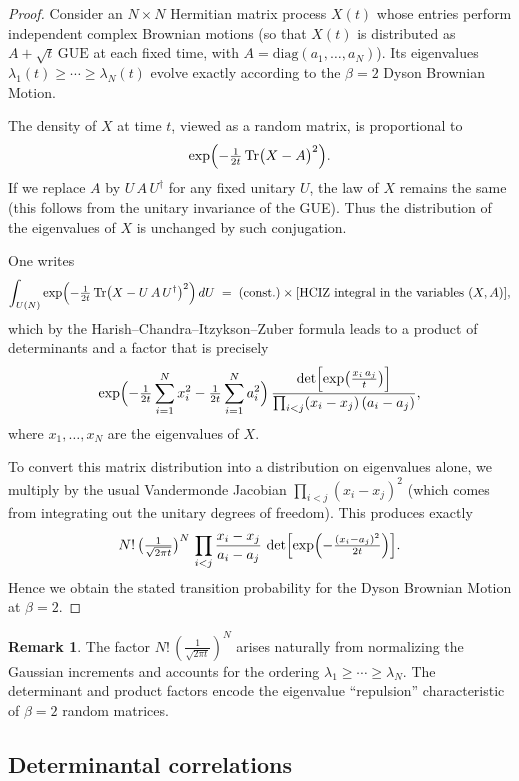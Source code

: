 \documentclass[letterpaper,11pt,oneside,reqno]{book}
\numberwithin{equation}{chapter}  %
\theoremstyle{definition}
\newtheorem{remark}[proposition]{Remark}
\begin{document}
\begin{proof}
Consider an \(N\times N\) Hermitian matrix process \(X(t)\) whose entries perform independent complex Brownian motions (so that \(X(t)\) is distributed as \(A + \sqrt{t}\,\mathrm{GUE}\) at each fixed time, with \(A=\mathrm{diag}(a_1,\dots,a_N)\)).  Its eigenvalues \(\lambda_1(t)\ge \cdots \ge \lambda_N(t)\) evolve exactly according to the \(\beta=2\) Dyson Brownian Motion.

The density of \(X\) at time \(t\), viewed as a random matrix, is proportional to
\[
\exp\Bigl(-\tfrac{1}{2t}\,\mathrm{Tr}\bigl(X-A\bigr)^2\Bigr).
\]
If we replace \(A\) by \(U\,A\,U^\dagger\) for any fixed unitary \(U\), the law of \(X\) remains the same (this follows from the unitary invariance of the GUE).  Thus the distribution of the eigenvalues of \(X\) is unchanged by such conjugation.

One writes
\[
\int_{U(N)}
\exp\Bigl(-\tfrac{1}{2t}\,\mathrm{Tr}\bigl(X-U\,A\,U^\dagger\bigr)^2\Bigr)\,dU
\;=\;
\text{(const.)} \times
\text{[HCIZ integral in the variables }(X,A)\text{]},
\]
which by the Harish--Chandra--Itzykson--Zuber formula leads to a product of determinants and a factor that is precisely
\[
\exp\Bigl(-\tfrac{1}{2t}\sum_{i=1}^N x_i^2
- \tfrac{1}{2t}\sum_{i=1}^N a_i^2\Bigr)\,
\frac{\det\Bigl[\exp\bigl(\tfrac{x_i\,a_j}{t}\bigr)\Bigr]}{\prod_{i<j}(x_i - x_j)\,(a_i - a_j)},
\]
where \(x_1,\dots,x_N\) are the eigenvalues of \(X\).

To convert this matrix distribution into a distribution on eigenvalues alone, we multiply by the usual Vandermonde Jacobian
\(\prod_{i<j}(x_i - x_j)^2\)
(which comes from integrating out the unitary degrees of freedom).  This produces exactly
\[
N!\,\bigl(\tfrac{1}{\sqrt{2\pi t}}\bigr)^{N}\,
\prod_{i<j}\frac{x_i - x_j}{a_i - a_j}
\,\det\Bigl[\exp\Bigl(-\tfrac{(x_i - a_j)^2}{2t}\Bigr)\Bigr].
\]
Hence we obtain the stated transition probability for the Dyson Brownian Motion at \(\beta=2\).
\end{proof}

\begin{remark}
The factor \(N!\,(\tfrac{1}{\sqrt{2\pi t}})^N\) arises naturally from normalizing the Gaussian increments and accounts for the ordering \(\lambda_1\ge\cdots\ge \lambda_N\).  The determinant and product factors encode the eigenvalue ``repulsion'' characteristic of \(\beta=2\) random matrices.
\end{remark}


\subsection{Determinantal correlations}
\end{document}
